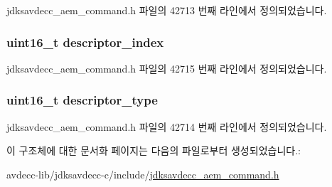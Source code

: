 jdksavdecc\+\_\+aem\+\_\+command.\+h 파일의 42713 번째 라인에서 정의되었습니다.

\subsubsection[{\texorpdfstring{descriptor\+\_\+index}{descriptor_index}}]{\setlength{\rightskip}{0pt plus 5cm}uint16\+\_\+t descriptor\+\_\+index}\hypertarget{structjdksavdecc__aem__command__disable__stream__encryption__response_a042bbc76d835b82d27c1932431ee38d4}{}\label{structjdksavdecc__aem__command__disable__stream__encryption__response_a042bbc76d835b82d27c1932431ee38d4}


jdksavdecc\+\_\+aem\+\_\+command.\+h 파일의 42715 번째 라인에서 정의되었습니다.

\subsubsection[{\texorpdfstring{descriptor\+\_\+type}{descriptor_type}}]{\setlength{\rightskip}{0pt plus 5cm}uint16\+\_\+t descriptor\+\_\+type}\hypertarget{structjdksavdecc__aem__command__disable__stream__encryption__response_ab7c32b6c7131c13d4ea3b7ee2f09b78d}{}\label{structjdksavdecc__aem__command__disable__stream__encryption__response_ab7c32b6c7131c13d4ea3b7ee2f09b78d}


jdksavdecc\+\_\+aem\+\_\+command.\+h 파일의 42714 번째 라인에서 정의되었습니다.



이 구조체에 대한 문서화 페이지는 다음의 파일로부터 생성되었습니다.\+:\begin{DoxyCompactItemize}
\item 
avdecc-\/lib/jdksavdecc-\/c/include/\hyperlink{jdksavdecc__aem__command_8h}{jdksavdecc\+\_\+aem\+\_\+command.\+h}\end{DoxyCompactItemize}
